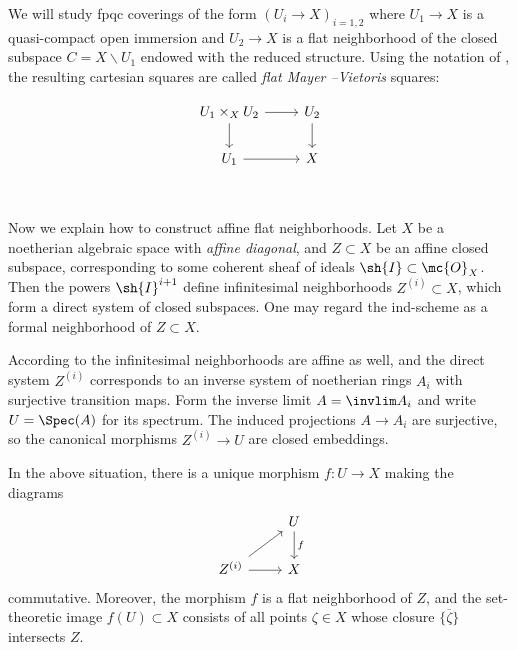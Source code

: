 \documentclass[12pt]{amsart}
\begin{document}
We will study fpqc coverings of the form $(U_i \to X)_{i=1,2}$ where $U_1 \to X$ is a quasi-compact open immersion and $U_2 \to X$ is a flat neighborhood of the closed subspace $C=X \smallsetminus U_1$ endowed with the reduced structure. Using the notation of \cite{hall2016mayer}, the resulting cartesian squares are called \emph{flat Mayer --Vietoris} squares:

\[\begin{tikzcd}
  U_1 \times_{X} U_2 \arrow[d] \arrow[r] & U_2 \arrow[d]  \\
  U_1 \arrow[r] &  X
  \end{tikzcd}
\]
\\\\
Now we explain how to construct affine flat neighborhoods. Let $X$ be a noetherian algebraic space with \emph{affine diagonal}, and $Z \subset X$ be an affine closed subspace, corresponding to some coherent sheaf of ideals $\sh{I} \subset \mc{O}_X$. Then the powers $\sh{I}^{i+1}$ define infinitesimal neighborhoods $Z^{(i)} \subset X$, which form a direct system
of closed subspaces. One may regard the ind-scheme as a formal neighborhood
of $Z\subset X$.


According to \cite[Tag 05YU]{stacks} the infinitesimal neighborhoods are affine as well, and the direct system $Z^{(i)}$ corresponds to an inverse system of noetherian rings $A_i$ with surjective transition maps.
Form the inverse limit $A=\invlim A_i$ and write $U=\Spec(A)$ for its spectrum. The induced projections $A \to A_i$ are surjective, so the canonical morphisms  $Z^{(i)} \to U$ are closed embeddings.

\begin{proposition} \label{prop:flatnhbd} In the above situation, there is a unique morphism $f:U \to X$ making the diagrams
$$
\begin{tikzcd} 
						& U\ar[d,"f"]\\	 
Z^{(i)}\ar[r]\ar[ur]	& X
\end{tikzcd}
$$
commutative. Moreover, the morphism $f$ is a flat neighborhood of $Z$, and the set-theoretic image $f(U)\subset X$ consists of all points $\zeta\in X$ whose closure $\overline{\{\zeta\}}$ intersects $Z$.  
\end{proposition}
\end{document}
